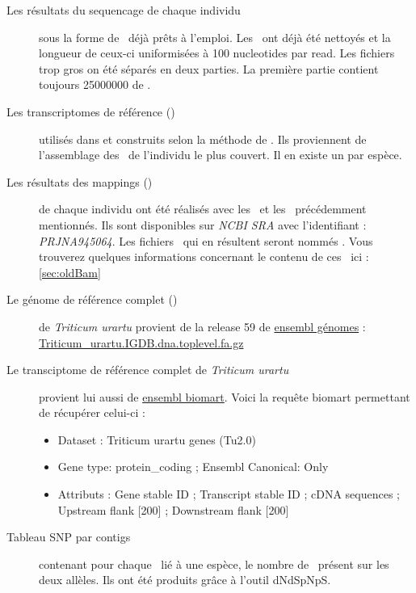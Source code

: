 \documentclass[../main]{subfiles} %
\begin{document}
\begin{description}
    \item[Les résultats du \gls{sequencage} de chaque individu] sous la forme de \fastq déjà prêts à l’emploi. Les \reads ont déjà été nettoyés et la longueur de ceux-ci uniformisées à 100 \glspl{nucleotide} par \gls{read}. Les fichiers trop gros on été séparés en deux parties. La première partie contient toujours \num{25 000 000} de \reads.
    
    \item[Les \glspl{transcriptome} de référence (\TrEx)] utilisés dans \cite{glemin_pervasive_2019} et construits selon la méthode de \cite{sarah_large_2017}. Ils proviennent de l'\gls{assemblage} des \reads de l’individu le plus couvert. Il en existe un par espèce. 

    \item[Les résultats des \glspl{mapping} (\OldBam)]  de chaque individu ont été réalisés avec les \fastq et les \TrEx précédemment mentionnés. Ils sont disponibles sur \textit{NCBI SRA} avec l'identifiant : \textit{PRJNA945064}. Les fichiers \bam qui en résultent seront nommés \OldBam. Vous trouverez quelques informations concernant le contenu de ces \bam ici : \cref{sec:oldBam}

    \item[Le génome de référence complet  (\GeMo)] de \textit{Triticum urartu} provient de la release 59 de \href{https://www.ensembl.org}{ensembl génomes} : \href{https://ftp.ebi.ac.uk/ensemblgenomes/pub/release-59/plants/fasta/triticum_urartu/dna/Triticum_urartu.IGDB.dna.toplevel.fa.gz}{Triticum\_urartu.IGDB.dna.toplevel.fa.gz} 

    \item[Le transciptome de référence complet  de \textit{Triticum urartu}] provient lui aussi de \href{https://www.ensembl.org}{ensembl biomart}. Voici la requête biomart permettant de récupérer celui-ci :
    \begin{itemize}
        \item Dataset : Triticum urartu genes (Tu2.0)
        \item Gene type: protein\_coding ; Ensembl Canonical: Only
        \item Attributs :  Gene stable ID ; Transcript stable ID ; cDNA sequences ; Upstream flank [200] ; Downstream flank [200]
    \end{itemize}
    
    \item[Tableau SNP par contigs ] contenant pour chaque \contig lié à une espèce, le nombre de \SNP présent sur les deux  
    allèles. Ils ont été produits grâce à l'outil \gls{dNdSpNpS}.


\end{description}
\end{document}
